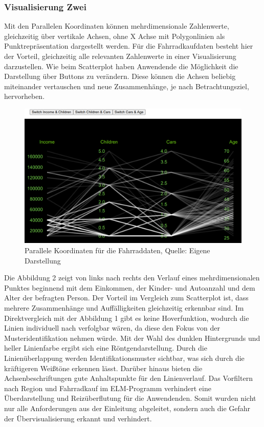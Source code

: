 \documentclass[usegeometry=true]{scrartcl}
\begin{document}
\subsubsection{Visualisierung Zwei}
Mit den Parallelen Koordinaten können mehrdimensionale Zahlenwerte, gleichzeitig über vertikale Achsen, ohne X Achse mit Polygonlinien als Punktrepräsentation dargestellt werden.
Für die Fahrradkaufdaten besteht hier der Vorteil, gleichzeitig alle relevanten Zahlenwerte in einer Visualisierung darzustellen. Wie beim Scatterplot haben Anwendende die Möglichkeit die Darstellung über Buttons zu verändern. Diese können die Achsen beliebig miteinander vertauschen und neue Zusammenhänge, je nach Betrachtungsziel, hervorheben. 
\begin{figure}[h]
\begin{center}
\includegraphics[width=16cm]{Bilder/V2ParalleleKoordinaten.png}
\caption{Parallele Koordinaten für die Fahrraddaten, Quelle: Eigene Darstellung}
\end{center}
\end{figure}
\newline Die Abbildung 2 zeigt von links nach rechts den Verlauf eines mehrdimensionalen Punktes beginnend mit dem Einkommen, der Kinder- und Autoanzahl und dem Alter der befragten Person. Der Vorteil im Vergleich zum Scatterplot ist, dass mehrere Zusammenhänge und Auffälligkeiten gleichzeitig erkennbar sind. Im Direktvergleich mit der Abbildung 1 gibt es keine Hoverfunktion, wodurch die Linien individuell nach verfolgbar wären, da diese den Fokus von der Musteridentifikation nehmen würde. Mit der Wahl des dunklen Hintergrunds und heller Linienfarbe ergibt sich eine Röntgendarstellung. Durch die Linienüberlappung werden Identifikationsmuster sichtbar, was sich durch die kräftigeren Weißtöne erkennen lässt. Darüber hinaus bieten die  Achsenbeschriftungen gute Anhaltspunkte für den Linienverlauf. Das Vorfiltern nach Region und Fahrradkauf im ELM-Programm verhindert eine Überdarstellung und Reizüberflutung für die Anwendenden. Somit wurden nicht nur alle Anforderungen aus der Einleitung abgeleitet, sondern auch die Gefahr der Übervisualisierung erkannt und verhindert.
\end{document}
